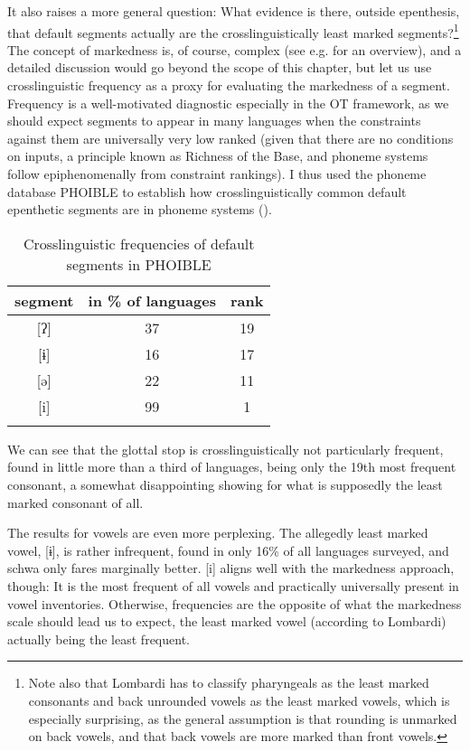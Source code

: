 \documentclass[output=paper,colorlinks,citecolor=brown]{langscibook}
\begin{document}
It also raises a more general question: What evidence is there, outside epenthesis, that default segments actually are the crosslinguistically least marked segments?\footnote{Note also that Lombardi has to classify pharyngeals as the least marked consonants and back unrounded vowels as the least marked vowels, which is especially surprising, as the general assumption is that rounding is unmarked on back vowels, and that back vowels are more marked than front vowels.}  The concept of markedness is, of course, complex (see e.g. \citealt{rice07} for an overview), and a detailed discussion would go beyond the scope of this chapter, but let us use crosslinguistic frequency as a proxy for evaluating the markedness of a segment. Frequency is a well-motivated diagnostic especially in the OT framework, as we should expect segments to appear in many languages when the constraints against them are universally very low ranked  (given that there are no conditions on inputs, a principle known as Richness of the Base, and phoneme systems follow epiphenomenally from constraint rankings). I thus used the phoneme database PHOIBLE \citep{phoible} to establish how crosslinguistically common default epenthetic segments are in phoneme systems ().


\begin{table}
\caption{Crosslinguistic frequencies of default segments in PHOIBLE}
\label{tab:1:frequencies}
 \begin{tabular}{c c c}
  \lsptoprule
             segment & in \% of languages  & rank \\
  \midrule
  {}[ʔ]  &   37  &    19  \\
  \midrule
  {}[ɨ]  &   16  &    17  \\
  {}[ə]  &   22  &    11  \\
  {}[i]  &   99  &    1  \\
  \lspbottomrule
 \end{tabular}
\end{table}

We can see that the glottal stop is crosslinguistically not particularly frequent, found in little more than a third of languages, being only the 19th most frequent consonant, a somewhat disappointing showing for what is supposedly the least marked consonant of all.

The results for vowels are even more perplexing. The allegedly least marked vowel, [ɨ], is rather infrequent, found in only 16\% of all languages surveyed, and schwa only fares marginally better. [i] aligns well with the markedness approach, though: It is the most frequent of all vowels and practically universally present in vowel inventories. Otherwise, frequencies are the opposite of what the mar\-kedness scale should lead us to expect,  the least marked vowel (according to Lombardi) actually being the least frequent. 
\end{document}
